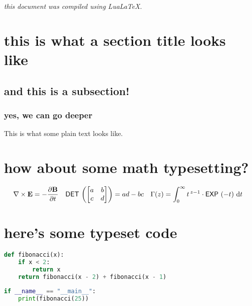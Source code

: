\documentclass[11pt]{article}
\begin{document}
{\centering \textit{this document was compiled using LuaLaTeX.}

}
\section{this is what a section title looks like}
\subsection{and this is a subsection!}
\subsubsection{yes, we can go deeper}
This is what some plain text looks like.

\section{how about some math typesetting?}

\begin{align*}
\nabla \times \vec{E} = - \frac{\Partial{\vec{B}}}{\Partial{t}} &&
\op{det} \left( \begin{bmatrix} a & b \\ c & d \end{bmatrix} \right) = ad - bc &&
\Gamma(z) = \int_0^{\infty} t^{\,z-1} \cdot \op{exp}\left(-t\right) \,\D{t} 
\end{align*}

\section{here's some typeset code}

\begin{lstlisting}[language=Python]
def fibonacci(x):
    if x < 2: 
        return x 
    return fibonacci(x - 2) + fibonacci(x - 1)
    
if __name__ == "__main__":
    print(fibonacci(25))
\end{lstlisting}
\end{document}
